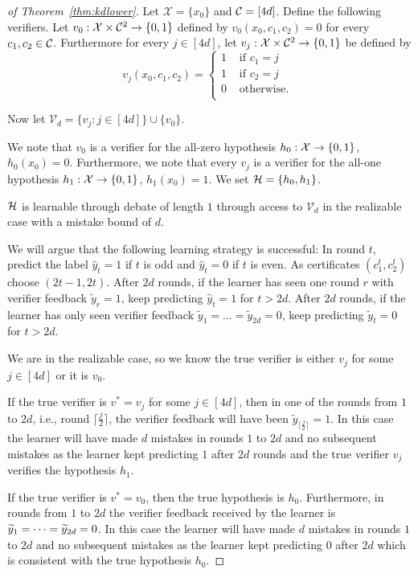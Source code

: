 \documentclass[anon]{alt2027} %
\begin{document}
\begin{proof}[of Theorem~\ref{thm:kdlower}]


Let $\mathcal{X}=\{x_0\}$ and ${{\mathcal C}} = [4d]$.
Define the following verifiers. Let $v_0: {\mathcal X} \times {{\mathcal C}}^2 \to \{0,1\}$ defined by  $v_0(x_0,c_1,c_2) = 0 $ for every $c_1, c_2 \in {{\mathcal C}}$.
Furthermore for every $j \in [4d]$, let $v_j: {\mathcal X} \times {{\mathcal C}}^2 \to \{0,1\}$ be defined by 
\[v_j (x_0, c_1, c_2) = \begin{cases}
    1 & \text{ if } c_1=j \\
    1 & \text{ if } c_2=j \\
        0 & \text{ otherwise. } \\
\end{cases}\]

Now let $\mathcal{V}_d= \{v_j : j \in [4d] \} \cup \{v_0\}$.

We note that $v_0$ is a verifier for the all-zero hypothesis $h_0: {\mathcal X} \to \{0,1\}$, $h_0(x_0) = 0$.
Furthermore, we note that every $v_j$ is a verifier for the all-one hypothesis $h_1: {\mathcal X} \to \{0,1\}$, $h_1(x_0) = 1$. We set ${{\mathcal H}} = \{h_0, h_1\}$.

\begin{claim}
 ${{\mathcal H}}$ is learnable through debate of length $1$ through access to $\mathcal{V}_d$ in the realizable case with a mistake bound of $d$.
\end{claim}
We will argue that the following learning strategy is successful: In round $t$, predict the label $\hat{y}_t= 1$ if $t$ is odd and $\hat{y}_t= 0$ if $t$ is even. As certificates $(c_1^t, c_2^t)$ choose $(2t-1,2t)$.
After $2d$ rounds, if the learner has seen one round $r$ with verifier feedback $\tilde{y}_r = 1$, keep predicting $\hat{y}_t = 1$ for $t > 2d$.
After $2d$ rounds, if the learner has only seen verifier feedback $\tilde{y}_1 = \dots = \tilde{y}_{2d} = 0$, keep predicting $\tilde{y}_t = 0$ for $t > 2d$.

We are in the realizable case, so we know the true verifier is either $v_j$ for some $j\in [4d]$ or it is $v_0$.

If the true verifier is $v^* = v_j$ for some $j\in [4d]$, then in one of the rounds from $1$ to $2d$, i.e., round $\lceil \frac{j}{2}\rceil$, the verifier feedback will have been $\tilde{y}_{\lceil\frac{j}{2}\rceil} =1$.
In this case the learner will have made $d$ mistakes in rounds $1$ to $2d$ and no subsequent mistakes as the learner kept predicting $1$ after $2d$ rounds and the true verifier $v_j$ verifies the hypothesis $h_1$.

If the true verifier is $v^* = v_0$, then the true hypothesis is $h_0$. Furthermore, in rounds from $1$ to $2d$ the verifier feedback received by the learner is ${\widetilde{y}}_1 = \dots = {\widetilde{y}}_{2d} = 0$.
In this case the learner will have made $d$ mistakes in rounds $1$ to $2d$ and no subsequent mistakes as the learner kept predicting $0$ after $2d$ which is consistent with the true hypothesis $h_0$.


\end{proof}
\end{document}
